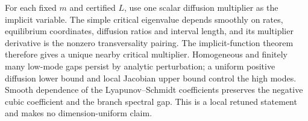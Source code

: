 For each fixed $m$ and certified $L$, use one scalar diffusion multiplier as the implicit variable. The simple critical eigenvalue depends smoothly on rates, equilibrium coordinates, diffusion ratios and interval length, and its multiplier derivative is the nonzero transversality pairing. The implicit-function theorem therefore gives a unique nearby critical multiplier. Homogeneous and finitely many low-mode gaps persist by analytic perturbation; a uniform positive diffusion lower bound and local Jacobian upper bound control the high modes. Smooth dependence of the Lyapunov--Schmidt coefficients preserves the negative cubic coefficient and the branch spectral gap. This is a local retuned statement and makes no dimension-uniform claim.
